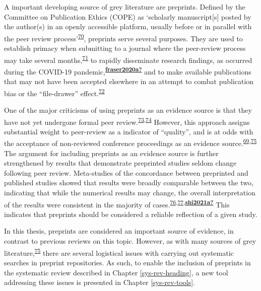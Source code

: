 \documentclass[a4paper, twoside]{templates/ociamthesis}
\begin{document}
A important developing source of grey literature are preprints. Defined by the Committee on Publication Ethics (COPE) as `scholarly manuscript{[}s{]} posted by the author(s) in an openly accessible platform, usually before or in parallel with the peer review process'\textsuperscript{\protect\hyperlink{ref-committeeonpublicationethicscope2018}{70}}, preprints serve several purposes. They are used to establish primacy when submitting to a journal where the peer-review process may take several months,\textsuperscript{\protect\hyperlink{ref-vale2016}{71}} to rapidly disseminate research findings, as occurred during the COVID-19 pandemic,\textsuperscript{\protect\hyperlink{ref-fraser2020a}{\textbf{fraser2020a?}}} and to make available publications that may not have been accepted elsewhere in an attempt to combat publication bias or the ``file-drawer'' effect.\textsuperscript{\protect\hyperlink{ref-rosenthal1979}{72}}

One of the major criticisms of using preprints as an evidence source is that they have not yet undergone formal peer review.\textsuperscript{\protect\hyperlink{ref-maslove2018}{73},\protect\hyperlink{ref-schalkwyk2020}{74}} However, this approach assigns substantial weight to peer-review as a indicator of ``quality'', and is at odds with the acceptance of non-reviewed conference proceedings as an evidence source.\textsuperscript{\protect\hyperlink{ref-lefebvre2019searching}{69},\protect\hyperlink{ref-mahood2014}{75}} The argument for including preprints as an evidence source is further strengthened by results that demonstrate preprinted studies seldom change following peer review. Meta-studies of the concordance between preprinted and published studies showed that results were broadly comparable between the two, indicating that while the numerical results may change, the overall interpretation of the results were consistent in the majority of cases.\textsuperscript{\protect\hyperlink{ref-klein2019}{76},\protect\hyperlink{ref-nicholson2021}{77},\protect\hyperlink{ref-shi2021a}{\textbf{shi2021a?}}} This indicates that preprints should be considered a reliable reflection of a given study.

In this thesis, preprints are considered an important source of evidence, in contrast to previous reviews on this topic. However, as with many sources of grey literature,\textsuperscript{\protect\hyperlink{ref-mahood2014}{75}} there are several logistical issues with carrying out systematic searches in preprint repositories. As such, to enable the inclusion of preprints in the systematic review described in Chapter \ref{sys-rev-heading}, a new tool addressing these issues is presented in Chapter \ref{sys-rev-tools}.
\end{document}
